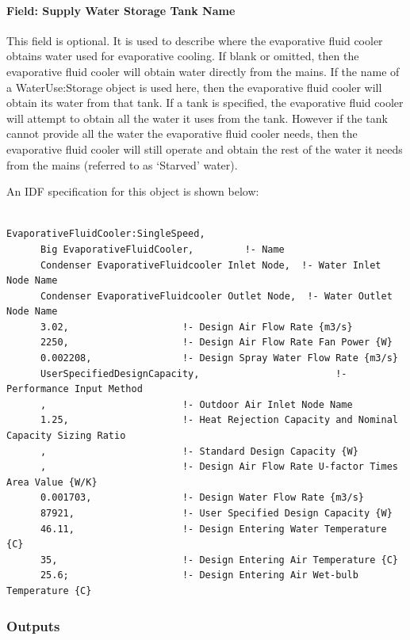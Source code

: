 \paragraph{Field: Supply Water Storage Tank Name}\label{field-supply-water-storage-tank-name-4}

This field is optional. It is used to describe where the evaporative fluid cooler obtains water used for evaporative cooling. If blank or omitted, then the evaporative fluid cooler will obtain water directly from the mains. If the name of a WaterUse:Storage object is used here, then the evaporative fluid cooler will obtain its water from that tank. If a tank is specified, the evaporative fluid cooler will attempt to obtain all the water it uses from the tank. However if the tank cannot provide all the water the evaporative fluid cooler needs, then the evaporative fluid cooler will still operate and obtain the rest of the water it needs from the mains (referred to as `Starved' water).

An IDF specification for this object is shown below:

\begin{lstlisting}

EvaporativeFluidCooler:SingleSpeed,
      Big EvaporativeFluidCooler,         !- Name
      Condenser EvaporativeFluidcooler Inlet Node,  !- Water Inlet Node Name
      Condenser EvaporativeFluidcooler Outlet Node,  !- Water Outlet Node Name
      3.02,                    !- Design Air Flow Rate {m3/s}
      2250,                    !- Design Air Flow Rate Fan Power {W}
      0.002208,                !- Design Spray Water Flow Rate {m3/s}
      UserSpecifiedDesignCapacity,                        !- Performance Input Method
      ,                        !- Outdoor Air Inlet Node Name
      1.25,                    !- Heat Rejection Capacity and Nominal Capacity Sizing Ratio
      ,                        !- Standard Design Capacity {W}
      ,                        !- Design Air Flow Rate U-factor Times Area Value {W/K}
      0.001703,                !- Design Water Flow Rate {m3/s}
      87921,                   !- User Specified Design Capacity {W}
      46.11,                   !- Design Entering Water Temperature {C}
      35,                      !- Design Entering Air Temperature {C}
      25.6;                    !- Design Entering Air Wet-bulb Temperature {C}
\end{lstlisting}

\subsubsection{Outputs}\label{outputs-6-001}

